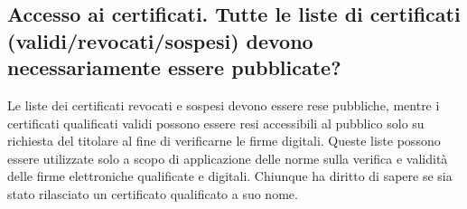 \subsection{Accesso ai certificati. Tutte le liste di certificati (validi/revocati/sospesi) devono necessariamente essere pubblicate?}
Le liste dei certificati revocati e sospesi devono essere rese pubbliche, mentre i certificati qualificati validi
possono essere resi accessibili al pubblico solo su richiesta del titolare al fine di verificarne le firme digitali.
Queste liste possono essere utilizzate solo a scopo di applicazione delle norme
sulla verifica e validità delle firme elettroniche qualificate e digitali.
Chiunque ha diritto di sapere se sia stato rilasciato un certificato qualificato a suo nome.
